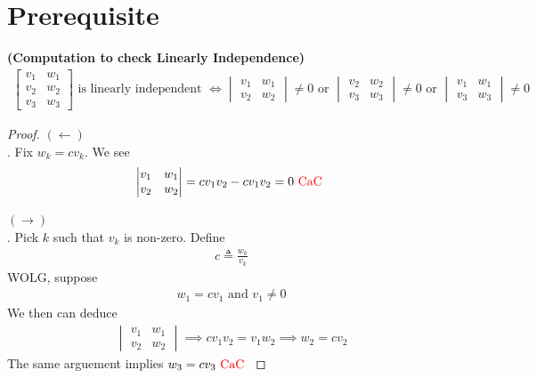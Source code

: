 \documentclass{report}
\begin{document}
\section{Prerequisite}
\begin{theorem}
  \textbf{(Computation to check Linearly Independence)} 
\begin{align*}
\begin{bmatrix}
  v_1 & w_1\\
  v_2 & w_2 \\
  v_3 & w_3
\end{bmatrix}\text{ is linearly independent }\iff \begin{vmatrix} 
  v_1 & w_1\\
  v_2 & w_2
\end{vmatrix}\neq 0\text{ or }\begin{vmatrix} 
  v_2 & w_2\\
  v_3 & w_3
\end{vmatrix}\neq 0\text{ or }\begin{vmatrix} 
  v_1 & w_1\\
  v_3 & w_3
\end{vmatrix}\neq 0
\end{align*}
\end{theorem}
\begin{proof}
$(\longleftarrow)$\\

. Fix $w_k=cv_k$. We see 
\begin{align*}
\begin{vmatrix} 
  v_1 & w_1 \\
  v_2 & w_2
\end{vmatrix}=cv_1v_2-cv_1v_2=0\text{ \textcolor{red}{CaC} }
\end{align*}

$(\longrightarrow)$\\

. Pick $k$ such that $v_k$ is non-zero. Define 
\begin{align*}
c\triangleq \frac{w_k}{v_k}
\end{align*}
WOLG, suppose 
\begin{align*}
w_1=cv_1\text{ and }v_1\neq 0
\end{align*}
We then can deduce
\begin{align*}
\begin{vmatrix} 
  v_1 & w_1 \\
  v_2 & w_2
\end{vmatrix}\implies cv_1v_2=v_1w_2 \implies w_2=cv_2
\end{align*}
The same arguement implies $w_3=cv_3\text{ \textcolor{red}{CaC} }$
\end{proof}
\end{document}
